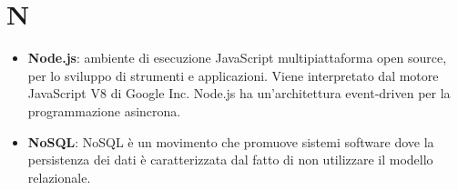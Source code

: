 \section{N}
\begin{itemize}
	\item \textbf{Node.js}: ambiente di esecuzione JavaScript multipiattaforma open source, per lo sviluppo di strumenti e applicazioni. Viene interpretato dal motore JavaScript V8 di Google Inc. Node.js ha un'architettura event-driven per la programmazione asincrona.
	\item \textbf{NoSQL}: NoSQL è un movimento che promuove sistemi software dove la persistenza dei dati è caratterizzata dal fatto di non utilizzare il modello relazionale.
\end{itemize}